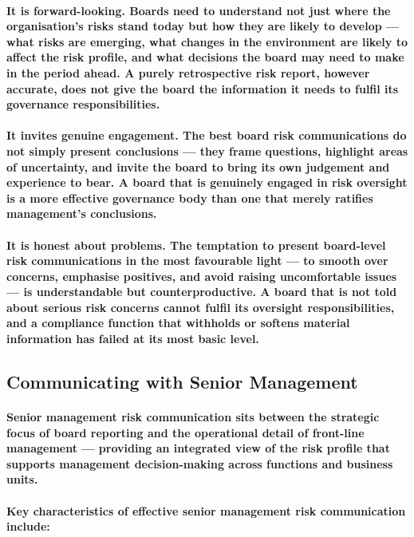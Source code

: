 \paragraph{\textbf{It is forward-looking}. Boards need to understand not just where the organisation's risks stand today but how they are likely to develop — what risks are emerging, what changes in the environment are likely to affect the risk profile, and what decisions the board may need to make in the period ahead. A purely retrospective risk report, however accurate, does not give the board the information it needs to fulfil its governance responsibilities.}
\paragraph{\textbf{It invites genuine engagement}. The best board risk communications do not simply present conclusions — they frame questions, highlight areas of uncertainty, and invite the board to bring its own judgement and experience to bear. A board that is genuinely engaged in risk oversight is a more effective governance body than one that merely ratifies management's conclusions.}
\paragraph{\textbf{It is honest about problems}. The temptation to present board-level risk communications in the most favourable light — to smooth over concerns, emphasise positives, and avoid raising uncomfortable issues — is understandable but counterproductive. A board that is not told about serious risk concerns cannot fulfil its oversight responsibilities, and a compliance function that withholds or softens material information has failed at its most basic level.}

\subsection{Communicating with Senior Management}
\paragraph{Senior management risk communication sits between the strategic focus of board reporting and the operational detail of front-line management — providing an integrated view of the risk profile that supports management decision-making across functions and business units.}
\paragraph{Key characteristics of effective senior management risk communication include:}
